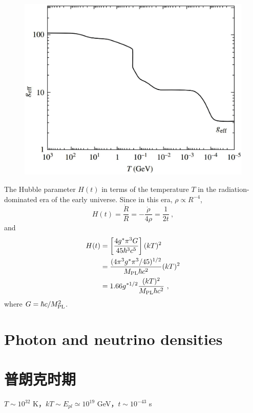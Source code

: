 \documentclass[12pt,a4paper]{article}
\begin{document}
\begin{figure}
\centering
\includegraphics[height=9.cm,angle=0]{geff.eps}
\caption{} 
\label{fig:geff}
\end{figure}

The Hubble parameter $H(t)$ in terms of the temperature $T$ in the radiation-dominated era of the early universe. Since in this era, $\rho \propto R^{-4}$,
\begin{equation}
H(t) = \dfrac{\dot{R}}{R} = - \dfrac{\dot{\rho}}{4\rho}  = \dfrac{1}{2t} ~,
\end{equation}
and
\begin{align}
\nonumber H(t) &= \left[\dfrac{4g^\ast \pi^3 G}{45 \hbar^3 c^5} \right] (kT)^2 \\
\nonumber &= \dfrac{(4 \pi^3 g^\ast \pi^3 /45)^{1/2}}{M_{\rm PL} \hbar c^2} (kT)^2 \\
&= 1.66 g^{\ast 1/2} \dfrac{(kT)^2}{M_{\rm PL} \hbar c^2} ~,
\end{align}
where $G = \hbar c/M_{\rm PL}^2$.

\section{Photon and neutrino densities}


\section{普朗克时期}
$T \sim 10^{32}$ K，$kT \sim E_{pl} \simeq 10^{19}$ GeV，$t \sim 10^{-43}$ s
\end{document}
